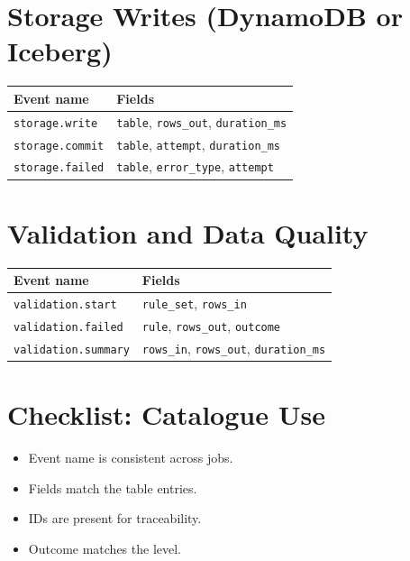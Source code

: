 \section{Storage Writes (DynamoDB or Iceberg)}
\begin{table}[h]
\centering
\begin{tabularx}{\textwidth}{lX}
\toprule
Event name & Fields \\
\midrule
\texttt{storage.write} & \texttt{table}, \texttt{rows\_out}, \texttt{duration\_ms} \\
\texttt{storage.commit} & \texttt{table}, \texttt{attempt}, \texttt{duration\_ms} \\
\texttt{storage.failed} & \texttt{table}, \texttt{error\_type}, \texttt{attempt} \\
\bottomrule
\end{tabularx}
\end{table}

\section{Validation and Data Quality}
\begin{table}[h]
\centering
\begin{tabularx}{\textwidth}{lX}
\toprule
Event name & Fields \\
\midrule
\texttt{validation.start} & \texttt{rule\_set}, \texttt{rows\_in} \\
\texttt{validation.failed} & \texttt{rule}, \texttt{rows\_out}, \texttt{outcome} \\
\texttt{validation.summary} & \texttt{rows\_in}, \texttt{rows\_out}, \texttt{duration\_ms} \\
\bottomrule
\end{tabularx}
\end{table}

\section{Checklist: Catalogue Use}
\begin{itemize}
\item Event name is consistent across jobs.
\item Fields match the table entries.
\item IDs are present for traceability.
\item Outcome matches the level.
\end{itemize}
